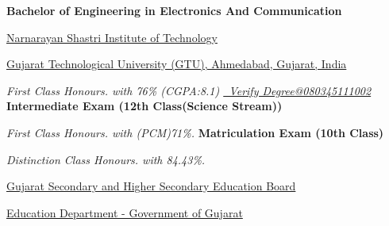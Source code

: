 \vspace*{-6mm}
\begin{rubric}{}
\entry*[2008 -- 2012]
	\textbf{Bachelor of Engineering in Electronics And Communication}\par
    \href{http://www.nsitgurukul.com/}{Narnarayan Shastri Institute of Technology}\par
    \href{https://www.gtu.ac.in/}{Gujarat Technological University (GTU), Ahmedabad, Gujarat, India}\par
	\emph{First Class Honours. with 76\% (CGPA:8.1) \href{https://drive.google.com/open?id=0B0EyoCxNFHkdRzIxSHFmLXA0a00}{{\faCertificate\ Verify Degree@080345111002}}}
\entry*[2006 -- 2008]
	\textbf{Intermediate Exam (12th Class(Science Stream))}\par
	\emph{First Class Honours. with (PCM)71\%.}
\entry*[1996 -- 2006]
	\textbf{Matriculation Exam (10th Class)}\par
	\emph{Distinction Class Honours. with 84.43\%.}\par
    \href{http://www.gseb.org/}{Gujarat Secondary and Higher Secondary Education Board}\par
    \href{http://gujarat-education.gov.in/education/}{Education Department - Government of Gujarat}\par
\end{rubric}